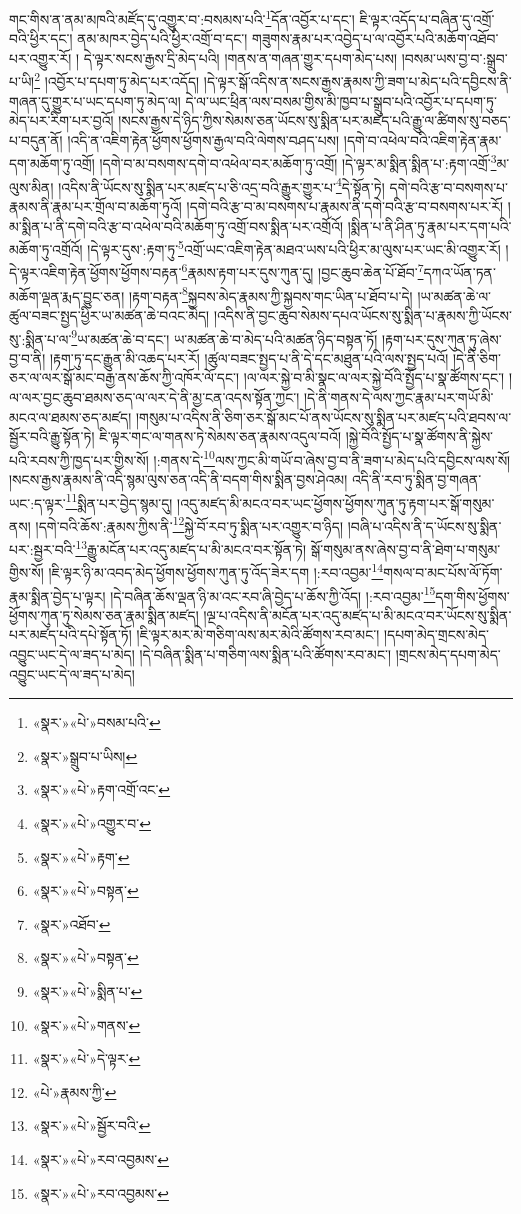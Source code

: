 གང་གིས་ན་ནམ་མཁའི་མཛོད་དུ་འགྱུར་བ་:བསམས་པའི་\footnote{«སྣར་»«པེ་»བསམ་པའི་}དོན་འབྱོར་པ་དང་། ཇི་ལྟར་འདོད་པ་བཞིན་དུ་འགྲོ་བའི་ཕྱིར་དང་། ནམ་མཁར་བྱེད་པའི་ཕྱིར་འགྲོ་བ་དང་། གཟུགས་རྣམ་པར་འབྱེད་པ་ལ་འབྱོར་པའི་མཆོག་འཐོབ་པར་འགྱུར་རོ། །
དེ་ལྟར་སངས་རྒྱས་དྲི་མེད་པའི། །གནས་ན་གཞན་གྱུར་དཔག་མེད་པས། །བསམ་ཡས་བྱ་བ་:སྒྲུབ་པ་ཡི།\footnote{«སྣར་»སྒྲུབ་པ་ཡིས།} །འབྱོར་པ་དཔག་ཏུ་མེད་པར་འདོད། །དེ་ལྟར་སྒོ་འདིས་ན་སངས་རྒྱས་རྣམས་ཀྱི་ཟག་པ་མེད་པའི་དབྱིངས་ནི་གཞན་དུ་གྱུར་པ་ཡང་དཔག་ཏུ་མེད་ལ། དེ་ལ་ཡང་ཕྲིན་ལས་བསམ་གྱིས་མི་ཁྱབ་པ་སྒྲུབ་པའི་འབྱོར་པ་དཔག་ཏུ་མེད་པར་རིག་པར་བྱའོ། །སངས་རྒྱས་དེ་ཉིད་ཀྱིས་སེམས་ཅན་ཡོངས་སུ་སྨིན་པར་མཛད་པའི་རྒྱུ་ལ་ཚིགས་སུ་བཅད་པ་བདུན་ནོ། །འདི་ན་འཇིག་རྟེན་ཕྱོགས་ཕྱོགས་རྒྱལ་བའི་ལེགས་བཤད་པས། །དགེ་བ་འཕེལ་བའི་འཇིག་རྟེན་རྣམ་དག་མཆོག་ཏུ་འགྲོ། །དགེ་བ་མ་བསགས་དགེ་བ་འཕེལ་བར་མཆོག་ཏུ་འགྲོ། །དེ་ལྟར་མ་སྨིན་སྨིན་པ་:རྟག་འགྲོ་\footnote{«སྣར་»«པེ་»རྟག་འགྲོ་འང་}མ་ལུས་མིན། །འདིས་ནི་ཡོངས་སུ་སྨིན་པར་མཛད་པ་ཅི་འདྲ་བའི་རྒྱུར་གྱུར་པ་\footnote{«སྣར་»«པེ་»འགྱུར་བ་}དེ་སྟོན་ཏེ། དགེ་བའི་རྩ་བ་བསགས་པ་རྣམས་ནི་རྣམ་པར་གྲོལ་བ་མཆོག་ཏུའོ། །དགེ་བའི་རྩ་བ་མ་བསགས་པ་རྣམས་ནི་དགེ་བའི་རྩ་བ་བསགས་པར་རོ། །མ་སྨིན་པ་ནི་དགེ་བའི་རྩ་བ་འཕེལ་བའི་མཆོག་ཏུ་འགྲོ་བས་སྨིན་པར་འགྲོའོ། །སྨིན་པ་ནི་ཤིན་ཏུ་རྣམ་པར་དག་པའི་མཆོག་ཏུ་འགྲོའོ། །དེ་ལྟར་དུས་:རྟག་ཏུ་\footnote{«སྣར་»«པེ་»རྟག་}འགྲོ་ཡང་འཇིག་རྟེན་མཐའ་ཡས་པའི་ཕྱིར་མ་ལུས་པར་ཡང་མི་འགྱུར་རོ། །དེ་ལྟར་འཇིག་རྟེན་ཕྱོགས་ཕྱོགས་བརྟན་\footnote{«སྣར་»«པེ་»བསྟན་}རྣམས་རྟག་པར་དུས་ཀུན་དུ། །བྱང་ཆུབ་ཆེན་པོ་ཐོབ་\footnote{«སྣར་»འཐོབ་}དཀའ་ཡོན་ཏན་མཆོག་ལྡན་རྨད་བྱུང་ཅན། །རྟག་བརྟན་\footnote{«སྣར་»«པེ་»བསྟན་}སྐྱབས་མེད་རྣམས་ཀྱི་སྐྱབས་གང་ཡིན་པ་ཐོབ་པ་དེ། །ཡ་མཚན་ཆེ་ལ་ཚུལ་བཟང་སྤྱད་ཕྱིར་ཡ་མཚན་ཆེ་བའང་མེད། །འདིས་ནི་བྱང་ཆུབ་སེམས་དཔའ་ཡོངས་སུ་སྨིན་པ་རྣམས་ཀྱི་ཡོངས་སུ་:སྨིན་པ་ལ་\footnote{«སྣར་»«པེ་»སྨིན་པ་}ཡ་མཚན་ཆེ་བ་དང་། ཡ་མཚན་ཆེ་བ་མེད་པའི་མཚན་ཉིད་བསྟན་ཏོ། །རྟག་པར་དུས་ཀུན་ཏུ་ཞེས་བྱ་བ་ནི། །རྟག་ཏུ་དང་རྒྱུན་མི་འཆད་པར་རོ། །ཚུལ་བཟང་སྤྱད་པ་ནི་དེ་དང་མཐུན་པའི་ལས་སྤྱད་པའོ། །དེ་ནི་ཅིག་ཅར་ལ་ལར་སྒོ་མང་བརྒྱ་ནས་ཆོས་ཀྱི་འཁོར་ལོ་དང་། །ལ་ལར་སྐྱེ་བ་མི་སྣང་ལ་ལར་སྐྱེ་བོའི་སྤྱོད་པ་སྣ་ཚོགས་དང་། །ལ་ལར་བྱང་ཆུབ་ཐམས་ཅད་ལ་ལར་དེ་ནི་མྱ་ངན་འདས་སྟོན་ཀྱང་། །དེ་ནི་གནས་དེ་ལས་ཀྱང་རྣམ་པར་གཡོ་མི་མངའ་ལ་ཐམས་ཅད་མཛད། །གསུམ་པ་འདིས་ནི་ཅིག་ཅར་སྒོ་མང་པོ་ནས་ཡོངས་སུ་སྨིན་པར་མཛད་པའི་ཐབས་ལ་སྦྱོར་བའི་རྒྱུ་སྟོན་ཏེ། ཇི་ལྟར་གང་ལ་གནས་ཏེ་སེམས་ཅན་རྣམས་འདུལ་བའོ། །སྐྱེ་བོའི་སྤྱོད་པ་སྣ་ཚོགས་ནི་སྐྱེས་པའི་རབས་ཀྱི་ཁྱད་པར་གྱིས་སོ། །:གནས་དེ་\footnote{«སྣར་»«པེ་»གནས་}ལས་ཀྱང་མི་གཡོ་བ་ཞེས་བྱ་བ་ནི་ཟག་པ་མེད་པའི་དབྱིངས་ལས་སོ། །སངས་རྒྱས་རྣམས་ནི་འདི་སྙམ་ལུས་ཅན་འདི་ནི་བདག་གིས་སྨིན་བྱས་ཤེའམ། འདི་ནི་རབ་ཏུ་སྨིན་བྱ་གཞན་ཡང་:ད་ལྟར་\footnote{«སྣར་»«པེ་»དེ་ལྟར་}སྨིན་པར་བྱེད་སྙམ་དུ། །འདུ་མཛད་མི་མངའ་བར་ཡང་ཕྱོགས་ཕྱོགས་ཀུན་ཏུ་རྟག་པར་སྒོ་གསུམ་ནས། །དགེ་བའི་ཆོས་:རྣམས་ཀྱིས་ནི་\footnote{«པེ་»རྣམས་ཀྱི་}སྐྱེ་བོ་རབ་ཏུ་སྨིན་པར་འགྱུར་བ་ཉིད། །བཞི་པ་འདིས་ནི་ད་ཡོངས་སུ་སྨིན་པར་:སྦྱར་བའི་\footnote{«སྣར་»«པེ་»སྦྱོར་བའི་}རྒྱུ་མངོན་པར་འདུ་མཛད་པ་མི་མངའ་བར་སྟོན་ཏེ། སྒོ་གསུམ་ནས་ཞེས་བྱ་བ་ནི་ཐེག་པ་གསུམ་གྱིས་སོ། །ཇི་ལྟར་ཉི་མ་འབད་མེད་ཕྱོགས་ཕྱོགས་ཀུན་ཏུ་འོད་ཟེར་དག །:རབ་འབྱམ་\footnote{«སྣར་»«པེ་»རབ་འབྱམས་}གསལ་བ་མང་པོས་ལོ་ཏོག་རྣམ་སྨིན་བྱེད་པ་ལྟར། །དེ་བཞིན་ཆོས་ལྡན་ཉི་མ་འང་རབ་ཞི་བྱེད་པ་ཆོས་ཀྱི་འོད། །:རབ་འབྱམ་\footnote{«སྣར་»«པེ་»རབ་འབྱམས་}དག་གིས་ཕྱོགས་ཕྱོགས་ཀུན་ཏུ་སེམས་ཅན་རྣམ་སྨིན་མཛད། །ལྔ་པ་འདིས་ནི་མངོན་པར་འདུ་མཛད་པ་མི་མངའ་བར་ཡོངས་སུ་སྨིན་པར་མཛད་པའི་དཔེ་སྟོན་ཏོ། །ཇི་ལྟར་མར་མེ་གཅིག་ལས་མར་མེའི་ཚོགས་རབ་མང་། །དཔག་མེད་གྲངས་མེད་འབྱུང་ཡང་དེ་ལ་ཟད་པ་མེད། །དེ་བཞིན་སྨིན་པ་གཅིག་ལས་སྨིན་པའི་ཚོགས་རབ་མང་། །གྲངས་མེད་དཔག་མེད་འབྱུང་ཡང་དེ་ལ་ཟད་པ་མེད། 